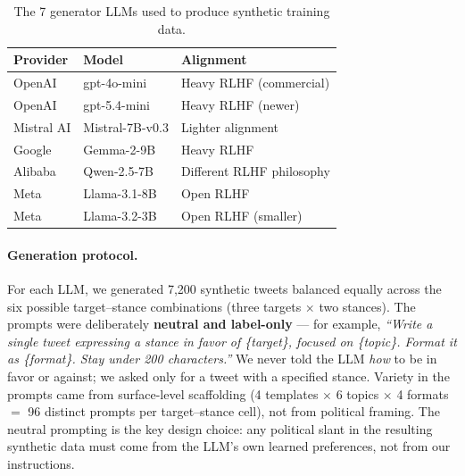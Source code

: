 \documentclass[11pt]{article}
\begin{document}
\begin{table}[t]
\centering
\small
\begin{tabular}{lll}
\toprule
\textbf{Provider} & \textbf{Model} & \textbf{Alignment} \\
\midrule
OpenAI     & gpt-4o-mini    & Heavy RLHF (commercial) \\
OpenAI     & gpt-5.4-mini   & Heavy RLHF (newer) \\
Mistral AI & Mistral-7B-v0.3 & Lighter alignment \\
Google     & Gemma-2-9B     & Heavy RLHF \\
Alibaba    & Qwen-2.5-7B    & Different RLHF philosophy \\
Meta       & Llama-3.1-8B   & Open RLHF \\
Meta       & Llama-3.2-3B   & Open RLHF (smaller) \\
\bottomrule
\end{tabular}
\caption{The 7 generator LLMs used to produce synthetic training data.}
\label{tab:generators}
\end{table}

\paragraph{Generation protocol.}
For each LLM, we generated 7{,}200 synthetic tweets balanced equally across the six possible target--stance combinations (three targets $\times$ two stances). The prompts were deliberately \textbf{neutral and label-only} --- for example, \emph{``Write a single tweet expressing a stance in favor of \{target\}, focused on \{topic\}. Format it as \{format\}. Stay under 200 characters.''} We never told the LLM \emph{how} to be in favor or against; we asked only for a tweet with a specified stance. Variety in the prompts came from surface-level scaffolding (4 templates $\times$ 6 topics $\times$ 4 formats $=$ 96 distinct prompts per target--stance cell), not from political framing. The neutral prompting is the key design choice: any political slant in the resulting synthetic data must come from the LLM's own learned preferences, not from our instructions.
\end{document}
